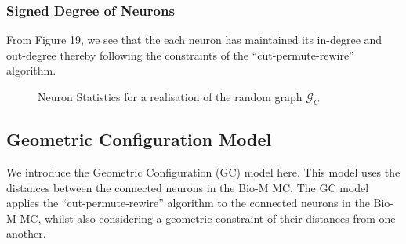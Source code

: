 \subsubsection{Signed Degree of Neurons}
From Figure 19, we see that the each neuron has maintained its in-degree and out-degree thereby following the constraints of the ``cut-permute-rewire'' \cite{WattsStrogatz1998} algorithm. 
\begin{figure}[H]%
    \centering
    \captionsetup{justification=centering}
    \qquad
    \caption{Neuron Statistics for a realisation of the random graph $\mathcal{G}_C$}%
    \label{fig:example}%
\end{figure}



\newpage
\subsection{Geometric Configuration Model}
We introduce the Geometric Configuration (GC) model here. This model uses the distances between the connected neurons in the Bio-M MC. The GC model applies the ``cut-permute-rewire'' \cite{WattsStrogatz1998} algorithm to the connected neurons in the Bio-M MC, whilst also considering a geometric constraint of their distances from one another. 
